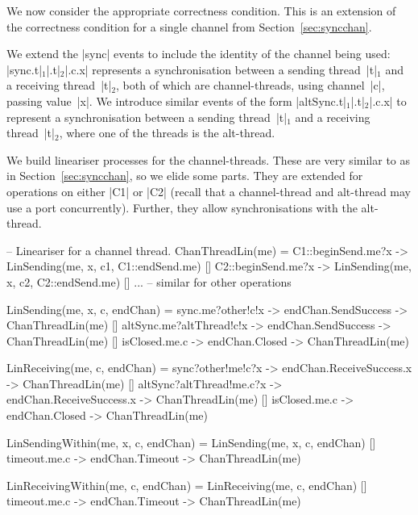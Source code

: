 
We now consider the appropriate correctness condition.   This is an extension
of the correctness condition for a single channel from
Section~\ref{sec:syncchan}. 

We extend the |sync| events to include the identity of the channel being used:
|sync.t|$_1$|.t|$_2$|.c.x| represents a synchronisation between a sending
thread~|t|$_1$ and a receiving thread~|t|$_2$, both of which are
channel-threads, using channel~|c|, passing value~|x|.
%
We introduce similar events of the form |altSync.t|$_1$|.t|$_2$|.c.x| to
represent a synchronisation between a sending thread~|t|$_1$ and a receiving
thread~|t|$_2$, where one of the threads is the alt-thread.

We build lineariser processes for the channel-threads.  These are very similar
to as in Section~\ref{sec:syncchan}, so we elide some parts.  They are
extended for operations on either |C1| or |C2| (recall that a channel-thread
and alt-thread may use a port concurrently).  Further, they allow
synchronisations with the alt-thread.
%
\begin{cspm}
-- Lineariser for a channel thread.
ChanThreadLin(me) = 
  C1::beginSend.me?x -> LinSending(me, x, c1, C1::endSend.me)
  [] C2::beginSend.me?x -> LinSending(me, x, c2, C2::endSend.me)
  [] ... -- similar for other operations 

LinSending(me, x, c, endChan) = 
  sync.me?other!c!x -> endChan.SendSuccess -> ChanThreadLin(me)
  [] altSync.me?altThread!c!x -> endChan.SendSuccess -> ChanThreadLin(me)
  [] isClosed.me.c -> endChan.Closed -> ChanThreadLin(me)

LinReceiving(me, c, endChan) = 
  sync?other!me!c?x -> endChan.ReceiveSuccess.x -> ChanThreadLin(me)
  [] altSync?altThread!me.c?x -> endChan.ReceiveSuccess.x -> ChanThreadLin(me)
  [] isClosed.me.c -> endChan.Closed -> ChanThreadLin(me)

LinSendingWithin(me, x, c, endChan) = 
  LinSending(me, x, c, endChan)
  [] timeout.me.c -> endChan.Timeout -> ChanThreadLin(me)

LinReceivingWithin(me, c, endChan) = 
  LinReceiving(me, c, endChan)
  [] timeout.me.c -> endChan.Timeout -> ChanThreadLin(me) 
\end{cspm}

